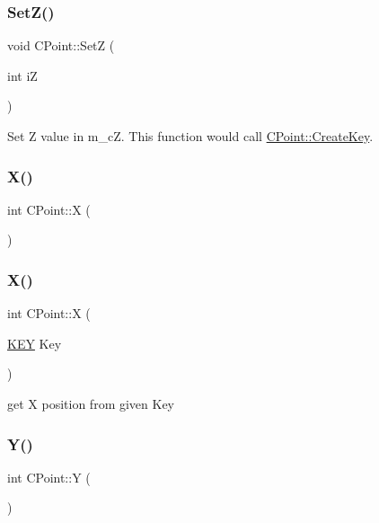 \subsubsection{\texorpdfstring{SetZ()}{SetZ()}}
{\footnotesize\ttfamily void C\+Point\+::\+SetZ (\begin{DoxyParamCaption}\item[{int}]{iZ }\end{DoxyParamCaption})}

Set Z value in m\+\_\+cZ. This function would call \mbox{\hyperlink{classCPoint_adff246311a759e9c7eaa5f5374dd3643}{C\+Point\+::\+Create\+Key}}. \mbox{\label{classCPoint_aeb92159e1d1045ceab79eea735d22af2}} 
\subsubsection{\texorpdfstring{X()}{X()}\hspace{0.1cm}{\footnotesize\ttfamily [1/2]}}
{\footnotesize\ttfamily int C\+Point\+::X (\begin{DoxyParamCaption}{ }\end{DoxyParamCaption})\hspace{0.3cm}{\ttfamily [inline]}}

\mbox{\label{classCPoint_aa748e36b6641c6259ca45e1cb7017f58}} 
\subsubsection{\texorpdfstring{X()}{X()}\hspace{0.1cm}{\footnotesize\ttfamily [2/2]}}
{\footnotesize\ttfamily int C\+Point\+::X (\begin{DoxyParamCaption}\item[{\mbox{\hyperlink{res2dmp_8cpp_a8ae9d53f33f46cfcfcb9736e6351452a}{K\+EY}}}]{Key }\end{DoxyParamCaption})\hspace{0.3cm}{\ttfamily [static]}}



get X position from given Key 

\mbox{\label{classCPoint_a8543d7ba2b9d1f9ec3373bd8258a66d0}} 
\subsubsection{\texorpdfstring{Y()}{Y()}\hspace{0.1cm}{\footnotesize\ttfamily [1/2]}}
{\footnotesize\ttfamily int C\+Point\+::Y (\begin{DoxyParamCaption}{ }\end{DoxyParamCaption})\hspace{0.3cm}{\ttfamily [inline]}}

